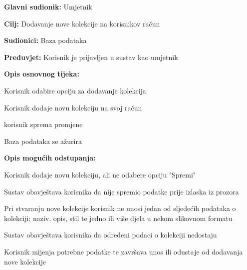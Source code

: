 					\noindent {}
					\begin{packed_item}
						
						\item \textbf{Glavni sudionik: }Umjetnik
						\item  \textbf{Cilj:} Dodavanje nove kolekcije na korisnikov račun
						\item  \textbf{Sudionici:} Baza podataka
						\item  \textbf{Preduvjet:} Korisnik je prijavljen u sustav kao umjetnik
						\item  \textbf{Opis osnovnog tijeka:}
						
						\item[] \begin{packed_enum}
							
							\item Korisnik odabire opciju za dodavanje kolekcija
							\item Korisnik dodaje novu kolekciju na svoj račun
							\item korisnik sprema promjene
							\item Baza podataka se ažurira					
						\end{packed_enum}
						
						\item  \textbf{Opis mogućih odstupanja:}
						
						\item[] \begin{packed_item}
							
							\item[2.a] Korisnik dodaje novu kolekciju, ali ne odabere opciju "Spremi"
							\item[] \begin{packed_enum}
								
								\item Sustav obavještava korisnika da nije spremio podatke prije izlaska iz prozora
								
							\end{packed_enum}
						
							\item[2.b] Pri stvaranju nove kolekcije korisnik ne unosi jedan od sljedećih podataka o kolekciji:
							naziv, opis, stil te jedno ili više djela u nekom slikovnom formatu
							\item[] \begin{packed_enum}
								
								\item Sustav obavještava korisnika da određeni podaci o kolekciji nedostaju
								\item Korisnik mijenja potrebne podatke te završava 
								unos ili odustaje od dodavanja nove kolekcije
							\end{packed_enum}
							
						\end{packed_item}
					\end{packed_item}
					
